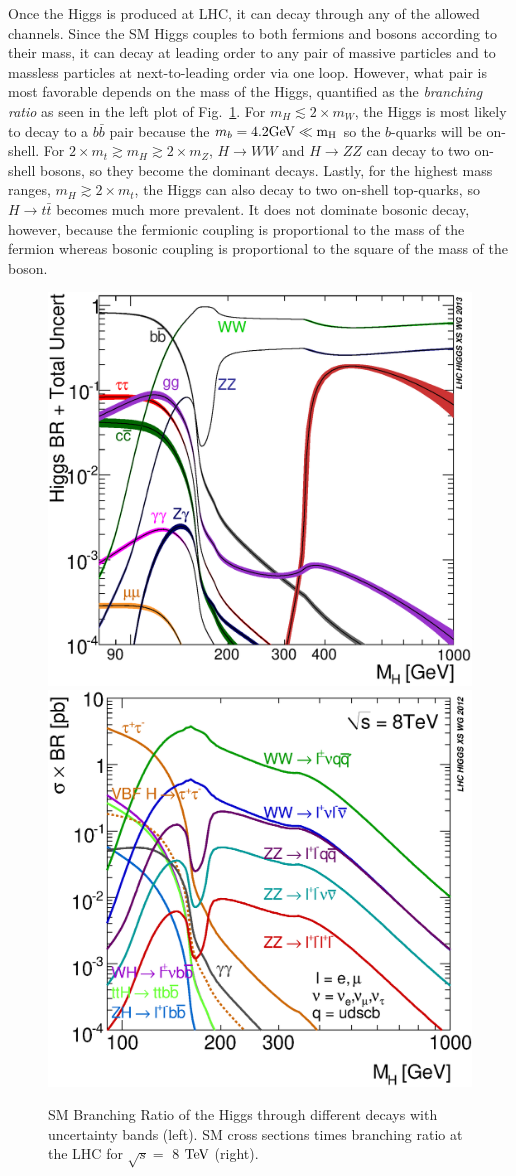 Once the Higgs is produced at LHC, it can decay through any of the allowed channels. Since the SM Higgs couples to both fermions and bosons according to their mass, it can decay at leading order to any pair of massive particles and to massless particles at next-to-leading order via one loop. However, what pair is most favorable depends on the mass of the Higgs, quantified as the \textit{branching ratio} as seen in the left plot of Fig.~\ref{fig:HXSWGDecay}. For $m_H\lesssim2\times m_W$, the Higgs is most likely to decay to a $b\bar{b}$ pair because the $m_b = 4.2 \rm{GeV} \ll m_H$ so the $b$-quarks will be on-shell. For $2\times m_t \gtrsim m_H \gtrsim 2\times m_Z$, $H\rightarrow WW$ and $H\rightarrow ZZ$ can decay to two on-shell bosons, so they become the dominant decays. Lastly, for the highest mass ranges, $m_H \gtrsim 2\times m_t$, the Higgs can also decay to two on-shell top-quarks, so $H\rightarrow t\bar{t}$ becomes much more prevalent. It does not dominate bosonic decay, however, because the fermionic coupling is proportional to the mass of the fermion whereas bosonic coupling is proportional to the square of the mass of the boson.

\begin{figure}[htbp]
\begin{center}
\includegraphics[width=.45\linewidth]{Phenomenology/figures/Higgs_BR}
\includegraphics[width=.45\linewidth]{Phenomenology/figures/XSBR_8TeV_SM_HM}
\caption[Standard Model Decay Branching Ratios for the Higgs at the LHC as a Function of the Higgs' Mass]{SM Branching Ratio of the Higgs through different decays with uncertainty bands (left). SM cross sections times branching ratio at the LHC for $\sqrt{s}=$ 8 $\rm{TeV}$ (right).~\cite{HXSWG_Properties}}
\label{fig:HXSWGDecay}
\end{center}
\end{figure}

